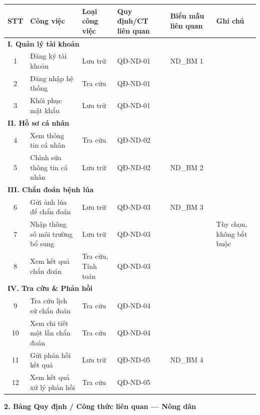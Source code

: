 ﻿\documentclass[12pt,a4paper]{article}
\begin{document}
\begin{longtable}{|c|p{3cm}|p{2cm}|p{2.5cm}|p{2cm}|p{2.5cm}|}
\hline
\rowcolor{headerblue}
\textbf{STT} & \textbf{Công việc} & \textbf{Loại công việc} & \textbf{Quy định/CT liên quan} & \textbf{Biểu mẫu liên quan} & \textbf{Ghi chú} \\
\hline
\endhead
\multicolumn{6}{|l|}{\cellcolor{notegreen}\textbf{I. Quản lý tài khoản}} \\
\hline
1 & Đăng ký tài khoản & Lưu trữ & QĐ-ND-01 & ND\_BM 1 & \\
\hline
2 & Đăng nhập hệ thống & Tra cứu & QĐ-ND-01 & & \\
\hline
3 & Khôi phục mật khẩu & Lưu trữ & QĐ-ND-01 & & \\
\hline
\multicolumn{6}{|l|}{\cellcolor{notegreen}\textbf{II. Hồ sơ cá nhân}} \\
\hline
4 & Xem thông tin cá nhân & Tra cứu & QĐ-ND-02 & & \\
\hline
5 & Chỉnh sửa thông tin cá nhân & Lưu trữ & QĐ-ND-02 & ND\_BM 2 & \\
\hline
\multicolumn{6}{|l|}{\cellcolor{notegreen}\textbf{III. Chẩn đoán bệnh lúa}} \\
\hline
6 & Gửi ảnh lúa để chẩn đoán & Lưu trữ & QĐ-ND-03 & ND\_BM 3 & \\
\hline
7 & Nhập thông số môi trường bổ sung & Lưu trữ & QĐ-ND-03 & & Tùy chọn, không bắt buộc \\
\hline
8 & Xem kết quả chẩn đoán & Tra cứu, Tính toán & QĐ-ND-03 & & \\
\hline
\multicolumn{6}{|l|}{\cellcolor{notegreen}\textbf{IV. Tra cứu \& Phản hồi}} \\
\hline
9 & Tra cứu lịch sử chẩn đoán & Tra cứu & QĐ-ND-04 & & \\
\hline
10 & Xem chi tiết một lần chẩn đoán & Tra cứu & QĐ-ND-04 & & \\
\hline
11 & Gửi phản hồi kết quả & Lưu trữ & QĐ-ND-05 & ND\_BM 4 & \\
\hline
12 & Xem kết quả xử lý phản hồi & Tra cứu & QĐ-ND-05 & & \\
\hline
\end{longtable}

\vspace{0.3cm}
\textbf{2. Bảng Quy định / Công thức liên quan --- Nông dân}
\end{document}
